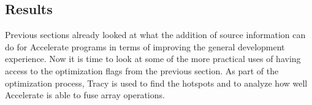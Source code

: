 \documentclass[fontsize=11pt,a4paper,parskip=half,numbers=noenddot]{scrartcl}
\newcommand{\hask}[1]{\texttt{#1}}
\begin{document}
\subsection{Results}




Previous sections already looked at what the addition of source information can
do for Accelerate programs in terms of improving the general development
experience. Now it is time to look at some of the more practical uses of having
access to the optimization flags from the previous section. As part of the
optimization process, Tracy is used to find the hotspots and to analyze how well
Accelerate is able to fuse array operations.
\end{document}
